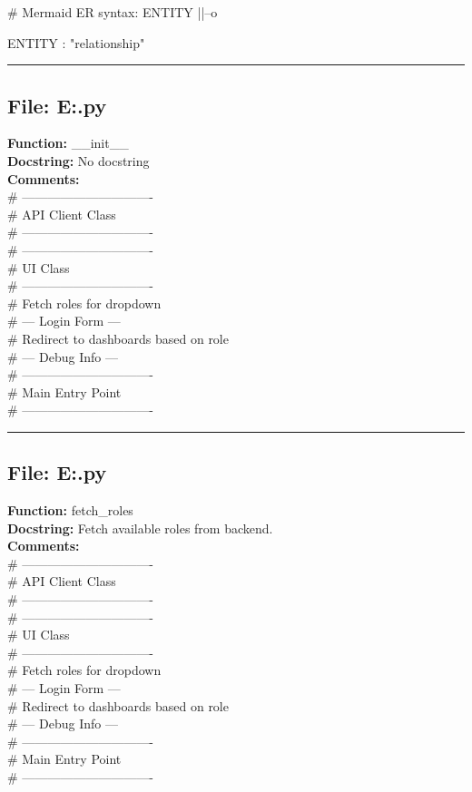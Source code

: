 # Mermaid ER syntax: ENTITY ||--o{ ENTITY : "relationship"\\

\hrule

\subsection*{File: E:\project\capstone\frontend\login.py}
\textbf{Function:} __init__\\
\textbf{Docstring:} No docstring\\
\textbf{Comments:}\\
# -------------------------------\\
# API Client Class\\
# -------------------------------\\
# -------------------------------\\
# UI Class\\
# -------------------------------\\
# Fetch roles for dropdown\\
# --- Login Form ---\\
# Redirect to dashboards based on role\\
# --- Debug Info ---\\
# -------------------------------\\
# Main Entry Point\\
# -------------------------------\\

\hrule

\subsection*{File: E:\project\capstone\frontend\login.py}
\textbf{Function:} fetch_roles\\
\textbf{Docstring:} Fetch available roles from backend.\\
\textbf{Comments:}\\
# -------------------------------\\
# API Client Class\\
# -------------------------------\\
# -------------------------------\\
# UI Class\\
# -------------------------------\\
# Fetch roles for dropdown\\
# --- Login Form ---\\
# Redirect to dashboards based on role\\
# --- Debug Info ---\\
# -------------------------------\\
# Main Entry Point\\
# -------------------------------\\

}

